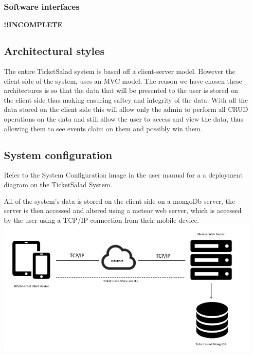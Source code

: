 \documentclass[11pt]{article}
\begin{document}
	\subsubsection{Software interfaces}
	\textbf{!!INCOMPLETE}
	\subsection{Architectural styles}
	The entire TicketSalad system is based off a client-server model. However the client side of the system, uses an MVC model. The reason we have chosen these architectures is so that the data that will be presented to the user is stored on the client side thus making ensuring saftey and integrity of the data. With all the data stored on the client side this will allow only the admin to perform all CRUD operations on the data and still allow the user to access and view the data, thus allowing them to see events claim on them and possibly win them.
	\subsection{System configuration}
	Refer to the System Configuration image in the user manual for a a deployment diagram on the TicketSalad System. 
	
	All of the system's data is stored on the client side on a mongoDb server, the server is then accessed and altered using a meteor web server, which is accessed by the user using a TCP/IP connection from their mobile device.
	\newline
	\includegraphics[scale=1]{SystemConfig.png}
	
	
\end{document}
